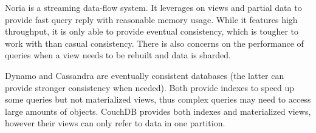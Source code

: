 \documentclass[sigconf, nonacm]{acmart}
\begin{document}
Noria \cite{noria} is a streaming data-flow system. 
It leverages on views and partial data to provide fast query reply with reasonable memory usage.
While it features high throughput, it is only able to provide eventual consistency, which is tougher to work with than casual consistency.
There is also concerns on the performance of queries when a view needs to be rebuilt and data is sharded.

Dynamo \cite{dynamo} and Cassandra \cite{cassandra} are eventually consistent databases (the latter can provide stronger consistency when needed).
Both provide indexes to speed up some queries but not materialized views, thus complex queries may need to access large amounts of objects.
CouchDB \cite{couchDB} provides both indexes and materialized views, however their views can only refer to data in one partition.




\end{document}
